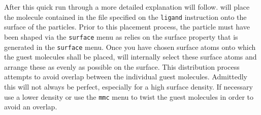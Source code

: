 After this quick run through a more detailed explanation will follow. 
\Discus
will place the molecule contained in the file specified on the
{\tt ligand} instruction onto the surface of the particles. Prior
to this placement process, the particle must have been shaped via the 
{\tt surface} menu as \Discus relies on the surface property that is
generated in the {\tt surface} menu. Once you have chosen surface 
atoms onto which the guest molecules shall be placed, \Discus will
internally select these surface atoms and arrange these as evenly as 
possible on the surface. This distribution process attempts to
avoid overlap between the individual guest molecules. Admittedly 
this will not always be perfect, especially for a high surface 
density. If necessary use a lower density or use the {\tt mmc} 
menu to twist the guest molecules in order to avoid an overlap.

